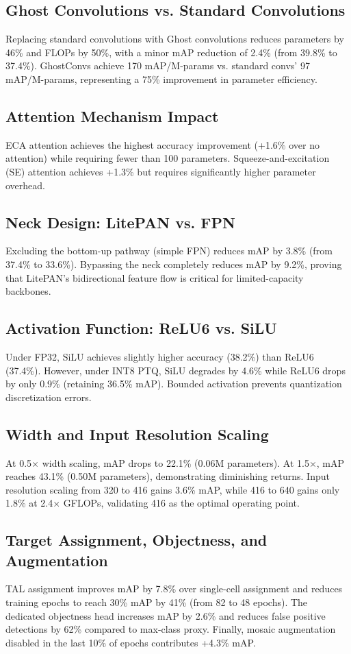 \documentclass[journal]{IEEEtran}
\begin{document}
\subsection{Ghost Convolutions vs. Standard Convolutions}
Replacing standard convolutions with Ghost convolutions reduces parameters by 46\% and FLOPs by 50\%, with a minor mAP reduction of 2.4\% (from 39.8\% to 37.4\%). GhostConvs achieve 170 mAP/M-params vs. standard convs' 97 mAP/M-params, representing a 75\% improvement in parameter efficiency.

\subsection{Attention Mechanism Impact}
ECA attention achieves the highest accuracy improvement (+1.6\% over no attention) while requiring fewer than 100 parameters. Squeeze-and-excitation (SE) attention achieves +1.3\% but requires significantly higher parameter overhead.

\subsection{Neck Design: LitePAN vs. FPN}
Excluding the bottom-up pathway (simple FPN) reduces mAP by 3.8\% (from 37.4\% to 33.6\%). Bypassing the neck completely reduces mAP by 9.2\%, proving that LitePAN's bidirectional feature flow is critical for limited-capacity backbones.

\subsection{Activation Function: ReLU6 vs. SiLU}
Under FP32, SiLU achieves slightly higher accuracy (38.2\%) than ReLU6 (37.4\%). However, under INT8 PTQ, SiLU degrades by 4.6\% while ReLU6 drops by only 0.9\% (retaining 36.5\% mAP). Bounded activation prevents quantization discretization errors.

\subsection{Width and Input Resolution Scaling}
At 0.5$\times$ width scaling, mAP drops to 22.1\% (0.06M parameters). At 1.5$\times$, mAP reaches 43.1\% (0.50M parameters), demonstrating diminishing returns. Input resolution scaling from 320 to 416 gains 3.6\% mAP, while 416 to 640 gains only 1.8\% at 2.4$\times$ GFLOPs, validating 416 as the optimal operating point.

\subsection{Target Assignment, Objectness, and Augmentation}
TAL assignment improves mAP by 7.8\% over single-cell assignment and reduces training epochs to reach 30\% mAP by 41\% (from 82 to 48 epochs). The dedicated objectness head increases mAP by 2.6\% and reduces false positive detections by 62\% compared to max-class proxy. Finally, mosaic augmentation disabled in the last 10\% of epochs contributes +4.3\% mAP.
\end{document}
